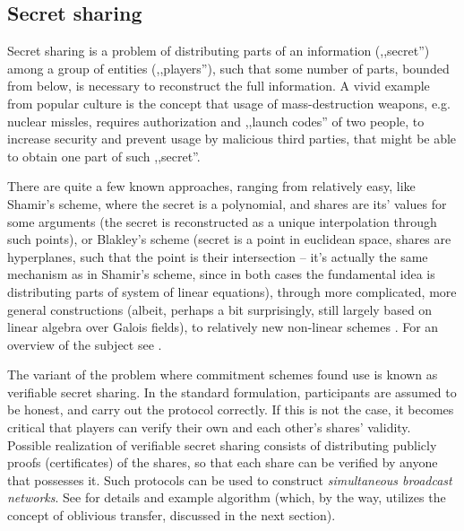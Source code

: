 \documentclass[10pt]{article}
\begin{document}
\subsection{Secret sharing}

Secret sharing is a problem of distributing parts of an information (,,secret'') among a group of
entities (,,players''), such that some number of parts, bounded from below, is necessary to 
reconstruct the full information. A vivid example from popular culture is the concept that usage
of mass-destruction weapons, e.g. nuclear missles, requires authorization and ,,launch codes'' of
two people, to increase security and prevent usage by malicious third parties, that might be able
to obtain one part of such ,,secret''.

There are quite a few known approaches, ranging from relatively easy, like Shamir's scheme, where
the secret is a polynomial, and shares are its' values for some arguments (the secret is reconstructed
as a unique interpolation through such points), or Blakley's scheme (secret is a point in euclidean
space, shares are hyperplanes, such that the point is their intersection -- it's actually the same
mechanism as in Shamir's scheme, since in both cases the fundamental idea is distributing parts of
system of linear equations), through more complicated, more general constructions (albeit, perhaps
a bit surprisingly, still largely based on linear algebra over Galois fields), to relatively new 
non-linear schemes \cite{Beimel01onthe}. For an overview of the subject see \cite{SharingSurvey}.

The variant of the problem where commitment schemes found use is known as verifiable secret sharing.
In the standard formulation, participants are assumed to be honest, and carry out the protocol correctly.
If this is not the case, it becomes critical that players can verify their own and each other's shares'
validity. Possible realization of verifiable secret sharing consists of distributing publicly proofs
(certificates) of the shares, so that each share can be verified by anyone that possesses it. Such
protocols can be used to construct \emph{simultaneous broadcast networks}. See \cite{VerifiableSharing}
for details and example algorithm (which, by the way, utilizes the concept of oblivious transfer,
discussed in the next section).


\nocite{*}



\end{document}
